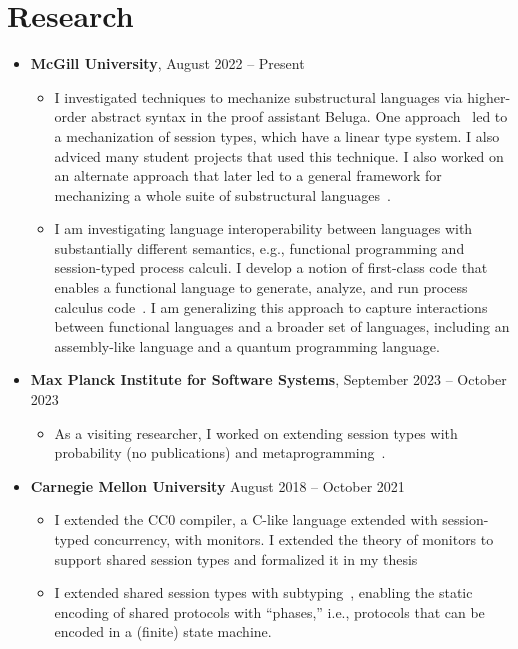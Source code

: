 \documentclass[11pt]{article}
\begin{document}
\section*{Research}
\begin{itemize}[leftmargin=*]
  \item \textbf{McGill University}, August 2022 -- Present
    \begin{itemize}
      \item I investigated techniques to mechanize substructural languages via higher-order abstract syntax in the proof assistant Beluga. One approach~\cite{Sano23oopsla} led to a mechanization of session types, which have a linear type system. I also adviced many student projects that used this technique. I also worked on an alternate approach that later led to a general framework for mechanizing a whole suite of substructural languages~\cite{Zackon25cpp}.
      \item I am investigating language interoperability between languages with substantially different semantics, e.g., functional programming and session-typed process calculi. I develop a notion of first-class code that enables a functional language to generate, analyze, and run process calculus code~\cite{Sano25icfp}. I am generalizing this approach to capture interactions between functional languages and a broader set of languages, including an assembly-like language and a quantum programming language.
    \end{itemize}
  \item \textbf{Max Planck Institute for Software Systems}, September 2023 -- October 2023
    \begin{itemize}
      \item As a visiting researcher, I worked on extending session types with probability (no publications) and metaprogramming~\cite{Sano25icfp}.
    \end{itemize}
  \item \textbf{Carnegie Mellon University} August 2018 -- October 2021
    \begin{itemize}
      \item I extended the CC0 compiler, a C-like language extended with session-typed concurrency, with monitors. I extended the theory of monitors to support shared session types and formalized it in my thesis~\cite{Sano19ms}
      \item I extended shared session types with subtyping~\cite{Sano21coordination}, enabling the static encoding of shared protocols with ``phases,'' i.e., protocols that can be encoded in a (finite) state machine.

\end{itemize}
\end{itemize}
\end{document}
